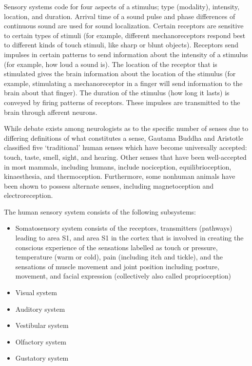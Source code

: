 \documentclass[]{book}
\providecommand{\tightlist}{%
  \setlength{\itemsep}{0pt}\setlength{\parskip}{0pt}}
\begin{document}
Sensory systems code for four aspects of a stimulus; type (modality), intensity, location, and duration. Arrival time of a sound pulse and phase differences of continuous sound are used for sound localization. Certain receptors are sensitive to certain types of stimuli (for example, different mechanoreceptors respond best to different kinds of touch stimuli, like sharp or blunt objects). Receptors send impulses in certain patterns to send information about the intensity of a stimulus (for example, how loud a sound is). The location of the receptor that is stimulated gives the brain information about the location of the stimulus (for example, stimulating a mechanoreceptor in a finger will send information to the brain about that finger). The duration of the stimulus (how long it lasts) is conveyed by firing patterns of receptors. These impulses are transmitted to the brain through afferent neurons.

While debate exists among neurologists as to the specific number of senses due to differing definitions of what constitutes a sense, Gautama Buddha and Aristotle classified five `traditional' human senses which have become universally accepted: touch, taste, smell, sight, and hearing. Other senses that have been well-accepted in most mammals, including humans, include nociception, equilibrioception, kinaesthesia, and thermoception. Furthermore, some nonhuman animals have been shown to possess alternate senses, including magnetoception and electroreception.

The human sensory system consists of the following subsystems:

\begin{itemize}
\tightlist
\item
  Somatosensory system consists of the receptors, transmitters (pathways) leading to area S1, and area S1 in the cortex that is involved in creating the conscious experience of the sensations labelled as touch or pressure, temperature (warm or cold), pain (including itch and tickle), and the sensations of muscle movement and joint position including posture, movement, and facial expression (collectively also called proprioception)
\item
  Visual system
\item
  Auditory system
\item
  Vestibular system
\item
  Olfactory system
\item
  Gustatory system
\end{itemize}
\end{document}
